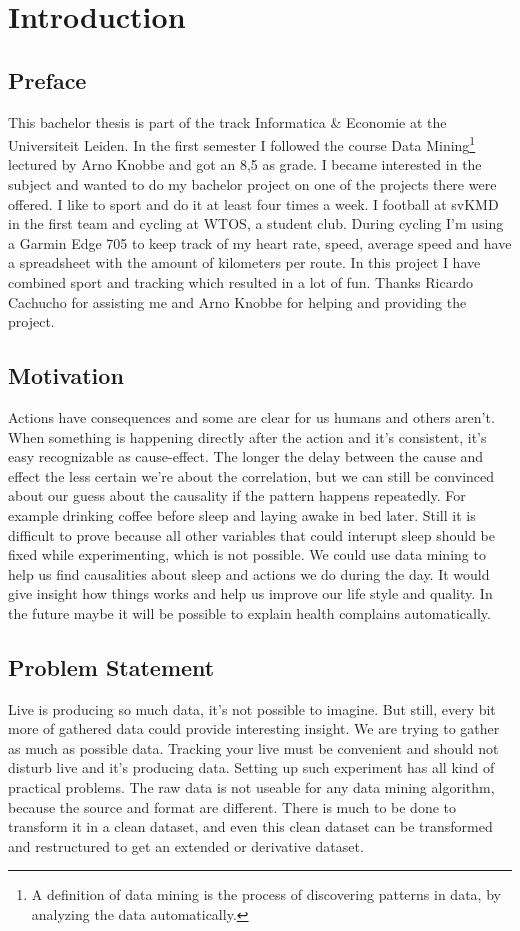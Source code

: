 \section{Introduction}
	\subsection{Preface}
		This bachelor thesis is part of the track Informatica \& Economie at the Universiteit Leiden. In the first semester I followed the course Data Mining\footnote{A definition of data mining is the process of discovering patterns in data, by analyzing the data automatically\cite{datamining}.} lectured by Arno Knobbe and got an 8,5 as grade. I became interested in the subject and wanted to do my bachelor project on one of the projects there were offered. I like to sport and do it at least four times a week. I football at svKMD in the first team and cycling at WTOS, a student club. During cycling I'm using a Garmin Edge 705 to keep track of my heart rate, speed, average speed and have a spreadsheet with the amount of kilometers per route. In this project I have combined sport and tracking which resulted in a lot of fun. Thanks Ricardo Cachucho for assisting me and Arno Knobbe for helping and providing the project.

	\subsection{Motivation}
		Actions have consequences and some are clear for us humans and others aren't. When something is happening directly after the action and it's consistent, it's easy recognizable as cause-effect. The longer the delay between the cause and effect the less certain we're about the correlation, but we can still be convinced about our guess about the causality if the pattern happens repeatedly. For example drinking coffee before sleep and laying awake in bed later. Still it is difficult to prove because all other variables that could interupt sleep should be fixed while experimenting, which is not possible. We could use data mining to help us find causalities about sleep and actions we do during the day. It would give insight how things works and help us improve our life style and quality. In the future maybe it will be possible to explain health complains automatically.

	\subsection{Problem Statement}
		Live is producing so much data, it's not possible to imagine. But still, every bit more of gathered data could provide interesting insight. We are trying to gather as much as possible data. Tracking your live must be convenient and should not disturb live and it's producing data. Setting up such experiment has all kind of practical problems. The raw data is not useable for any data mining algorithm, because the source and format are different. There is much to be done to transform it in a clean dataset, and even this clean dataset can be transformed and restructured to get an extended or derivative dataset. 

